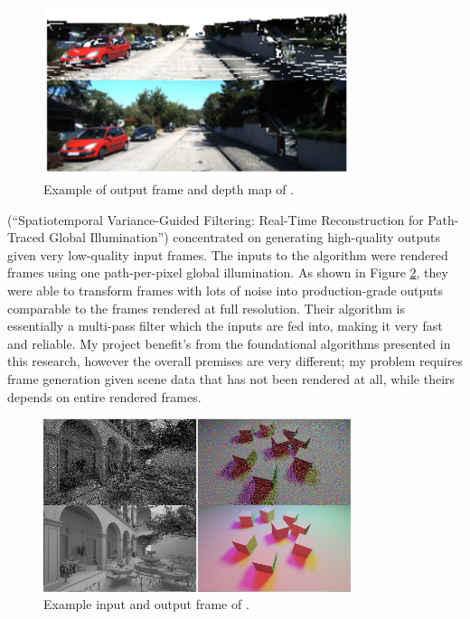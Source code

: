 \documentclass[conference]{IEEEtran}
\begin{document}
\begin{figure}[htbp]
\centerline{\includegraphics[width=9cm]{frame_prediction.png}}
\caption{Example of output frame and depth map of \cite{ref:frame_prediction}.}
\label{fig:frame_prediction}
\end{figure}

\cite{ref:spatiotemporal} (``Spatiotemporal Variance-Guided Filtering: Real-Time Reconstruction for
Path-Traced Global Illumination'') concentrated on
generating high-quality outputs given very low-quality input
frames. The inputs to the algorithm were rendered frames using one path-per-pixel global
illumination. As shown in Figure \ref{fig:spatiotemporal}, they were able to
transform frames with lots of noise into production-grade outputs comparable to
the frames rendered at full resolution. Their algorithm is essentially a
multi-pass filter which the inputs are fed into, making it very fast and
reliable. My project benefit's from the foundational algorithms presented in
this research, however the overall premises are very different; my problem
requires frame generation given scene data that has not been rendered at all,
while theirs depends on entire rendered frames.

\begin{figure}[htbp]
\centerline{\includegraphics[width=9cm]{spatiotemporal.png}}
\caption{Example input and output frame of \cite{ref:spatiotemporal}.}
\label{fig:spatiotemporal}
\end{figure}
\end{document}
